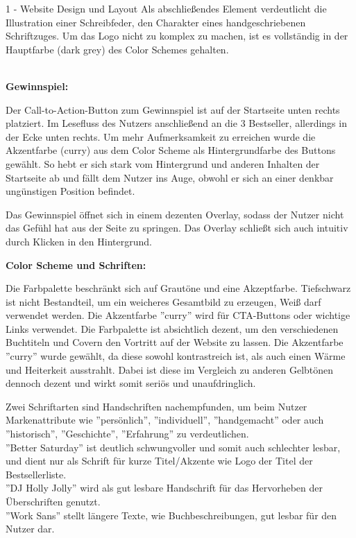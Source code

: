 \documentclass[a4paper]{article}
\begin{document}
\begin{exercise}{1 - Website Design und Layout}
Als abschließendes Element verdeutlicht die Illustration einer Schreibfeder, den Charakter eines handgeschriebenen Schriftzuges.
Um das Logo nicht zu komplex zu machen, ist es vollständig in der Hauptfarbe (dark grey) des Color Schemes gehalten.\\\\

\begin{Large}
\textbf{Gewinnspiel:}
\end{Large}
Der Call-to-Action-Button zum Gewinnspiel ist auf der Startseite unten rechts platziert. Im Lesefluss des Nutzers anschließend an die 3 Bestseller, allerdings in der Ecke unten rechts. Um mehr Aufmerksamkeit zu erreichen wurde die Akzentfarbe (curry) aus dem Color Scheme als Hintergrundfarbe des Buttons gewählt.
So hebt er sich stark vom Hintergrund und anderen Inhalten der Startseite ab und fällt dem Nutzer ins Auge, obwohl er sich an einer denkbar ungünstigen Position befindet.

Das Gewinnspiel öffnet sich in einem dezenten Overlay, sodass der Nutzer nicht das Gefühl hat aus der Seite zu springen. Das Overlay schließt sich auch intuitiv durch Klicken in den Hintergrund.
\newpage
\begin{Large}
\textbf{Color Scheme und Schriften:}
\end{Large}
Die Farbpalette beschränkt sich auf Grautöne und eine Akzeptfarbe. Tiefschwarz ist nicht Bestandteil, um ein weicheres Gesamtbild zu erzeugen, Weiß darf verwendet werden. Die Akzentfarbe ''curry'' wird für CTA-Buttons oder wichtige Links verwendet. 
Die Farbpalette ist absichtlich dezent, um den verschiedenen Buchtiteln und Covern den Vortritt auf der Website zu lassen. Die Akzentfarbe ''curry'' wurde gewählt, da diese sowohl kontrastreich ist, als auch einen Wärme und Heiterkeit ausstrahlt. Dabei ist diese im Vergleich zu anderen Gelbtönen dennoch dezent und wirkt somit seriös und unaufdringlich. 

Zwei Schriftarten sind Handschriften nachempfunden, um beim Nutzer Markenattribute wie ''persönlich'', ''individuell'', ''handgemacht'' oder auch ''historisch'', ''Geschichte'', ''Erfahrung''  zu verdeutlichen. \\
''Better Saturday'' ist deutlich schwungvoller und somit auch schlechter lesbar, und dient nur als Schrift für kurze Titel/Akzente wie Logo der Titel der Bestsellerliste. \\
''DJ Holly Jolly'' wird als gut lesbare Handschrift für das Hervorheben der Überschriften genutzt. \\
''Work Sans'' stellt längere Texte, wie Buchbeschreibungen, gut lesbar für den Nutzer dar.


\end{exercise}
\end{document}

